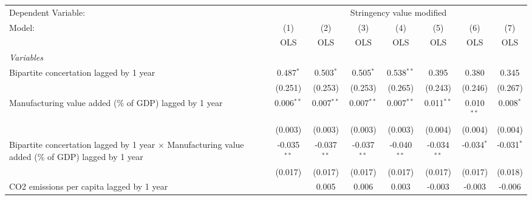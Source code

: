 
\begingroup
\centering
\begin{tabular}{lccccccc}
   \toprule
   Dependent Variable: & \multicolumn{7}{c}{Stringency value modified}\\
   Model:                                                                                                    & (1)           & (2)           & (3)           & (4)           & (5)           & (6)          & (7)\\  
                                                                                                             &  OLS          & OLS           & OLS           & OLS           & OLS           & OLS          & OLS\\  
   \midrule
   \emph{Variables}\\
   Bipartite concertation lagged by 1 year                                                                   & 0.487$^{*}$   & 0.503$^{*}$   & 0.505$^{*}$   & 0.538$^{**}$  & 0.395         & 0.380        & 0.345\\   
                                                                                                             & (0.251)       & (0.253)       & (0.253)       & (0.265)       & (0.243)       & (0.246)      & (0.267)\\   
   Manufacturing value added (\% of GDP) lagged by 1 year                                                    & 0.006$^{**}$  & 0.007$^{**}$  & 0.007$^{**}$  & 0.007$^{**}$  & 0.011$^{**}$  & 0.010$^{**}$ & 0.008$^{*}$\\   
                                                                                                             & (0.003)       & (0.003)       & (0.003)       & (0.003)       & (0.004)       & (0.004)      & (0.004)\\   
   Bipartite concertation lagged by 1 year $\times$ Manufacturing value added (\% of GDP) lagged by 1 year   & -0.035$^{**}$ & -0.037$^{**}$ & -0.037$^{**}$ & -0.040$^{**}$ & -0.034$^{**}$ & -0.034$^{*}$ & -0.031$^{*}$\\   
                                                                                                             & (0.017)       & (0.017)       & (0.017)       & (0.017)       & (0.017)       & (0.017)      & (0.018)\\   
   CO2 emissions per capita lagged by 1 year                                                                 &               & 0.005         & 0.006         & 0.003         & -0.003        & -0.003       & -0.006\\   

\end{tabular}
